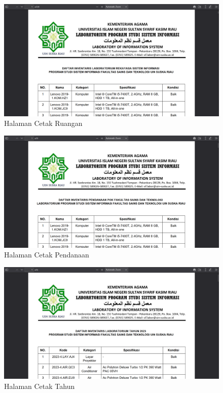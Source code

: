 \begin{enumerate}
        \begin{figure}
          \centering
          \includegraphics[width=0.82\linewidth]{konten//gambar/barang cetak ruangan pdf.png}
          \caption{Halaman Cetak Ruangan}
          \label{fig:enter-label}
        \end{figure}

        \begin{figure}
          \centering
          \includegraphics[width=0.82\linewidth]{konten//gambar/barang cetak pendanaan pdf.png}
          \caption{Halaman Cetak Pendanaan}
          \label{fig:enter-label}
        \end{figure}

        \begin{figure}
          \centering
          \includegraphics[width=0.82\linewidth]{konten//gambar/barang cetak tahun pdf.png}
          \caption{Halaman Cetak Tahun}
          \label{fig:enter-label}
        \end{figure}


\end{enumerate}
